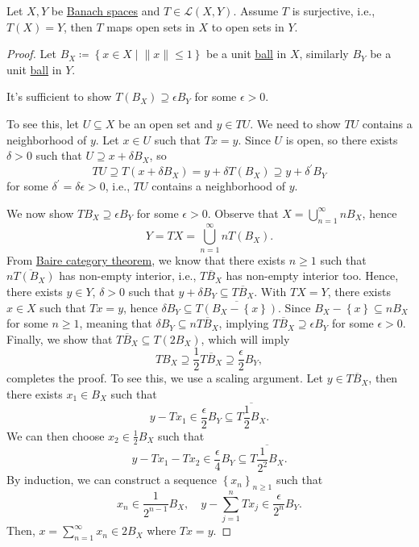 \begin{theorem}\label{thm:open-mapping}
	Let \(X, Y\) be \hyperref[def:Banach-space]{Banach spaces} and \(T\in \mathcal{L} (X, Y)\). Assume \(T\) is surjective, i.e., \(T(X)= Y\), then \(T\) maps open sets in \(X\) to open sets in \(Y\).
\end{theorem}
\begin{proof}
	Let \(B_X \coloneqq \left\{ x\in X \mid \lVert x\rVert \leq 1 \right\} \) be a unit \hyperref[def:ball]{ball} in \(X\), similarly \(B_Y\) be a unit \hyperref[def:ball]{ball} in \(Y\).

	\begin{claim}
		It's sufficient to show \(T(B_X) \supseteq \epsilon B_Y\) for some \(\epsilon > 0\).
	\end{claim}
	\begin{explanation}
		To see this, let \(U \subseteq X\) be an open set and \(y\in TU\). We need to show \(TU\) contains a neighborhood of \(y\). Let \(x\in U\) such that \(Tx = y\). Since \(U\) is open, so there exists \(\delta > 0\) such that \(U \supseteq x + \delta B_X\), so
		\[
			TU \supseteq T(x + \delta B_X) = y + \delta T(B_X) \supseteq y + \delta ^\prime B_Y
		\]
		for some \(\delta ^\prime = \delta \epsilon > 0\), i.e., \(TU\) contains a neighborhood of \(y\).
	\end{explanation}

	We now show \(TB_X \supseteq \epsilon B_Y\) for some \(\epsilon > 0\). Observe that \(X = \bigcup_{n=1}^{\infty} n B_X\), hence
	\[
		Y = TX = \bigcup\limits_{n=1}^{\infty } n T(B_{X}).
	\]
	From \hyperref[prop:Baire-category]{Baire category theorem}, we know that there exists \(n \geq 1\) such that \(\overline{nT(B_X)}\) has non-empty interior, i.e., \(\overline{TB_X}\) has non-empty interior too. Hence, there exists \(y\in Y\), \(\delta > 0\) such that \(y + \delta B_Y \subseteq \overline{TB_X}\). With \(TX=Y\), there exists \(x\in X\) such that \(Tx = y\), hence \(\delta B_Y \subseteq \overline{T(B_X - \left\{ x \right\} )}\). Since \(B_X - \left\{ x \right\} \subseteq n B_X\) for some \(n \geq 1\), meaning that \(\delta B_Y \subseteq n \overline{TB_X}\), implying \(\overline{TB_X}\supseteq \epsilon B_Y\) for some \(\epsilon > 0\). Finally, we show that \(\overline{TB_X} \subseteq T(2 B_X)\), which will imply
	\[
		TB_X \supseteq \frac{1}{2}\overline{TB_X} \supseteq \frac{\epsilon}{2} B_Y,
	\]
	completes the proof. To see this, we use a scaling argument. Let \(y\in \overline{TB_X}\), then there exists \(x_1 \in B_X\) such that
	\[
		y-Tx_1 \in \frac{\epsilon}{2} B_Y \subseteq \overline{T \frac{1}{2}B_X}.
	\]
	We can then choose \(x_2\in \frac{1}{2}B_X\) such that
	\[
		y-Tx_1 - Tx_2 \in \frac{\epsilon}{4}B_Y \subseteq \overline{T\frac{1}{2^2}B_X}.
	\]
	By induction, we can construct a sequence \(\left\{ x_n \right\}_{n\geq 1} \) such that
	\[
		x_n \in \frac{1}{2^{n-1}}B_X,\quad y- \sum_{j=1}^n Tx_j\in \frac{\epsilon}{2^n} B_Y.
	\]
	Then, \(x = \sum_{n=1} ^{\infty }x_n \in 2B_X\) where \(Tx = y\).
\end{proof}

